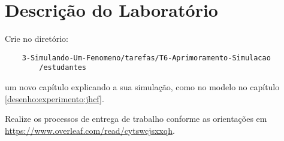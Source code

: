 \section{Descrição do Laboratório}

Crie no diretório:
\begin{verbatim}
    3-Simulando-Um-Fenomeno/tarefas/T6-Aprimoramento-Simulacao
        /estudantes
\end{verbatim}
um novo capítulo explicando a sua simulação, como no modelo no capítulo \ref{desenho:experimento:jhcf}.

Realize os processos de entrega de trabalho conforme as orientações em \url{https://www.overleaf.com/read/cytswcjsxxqh}.

